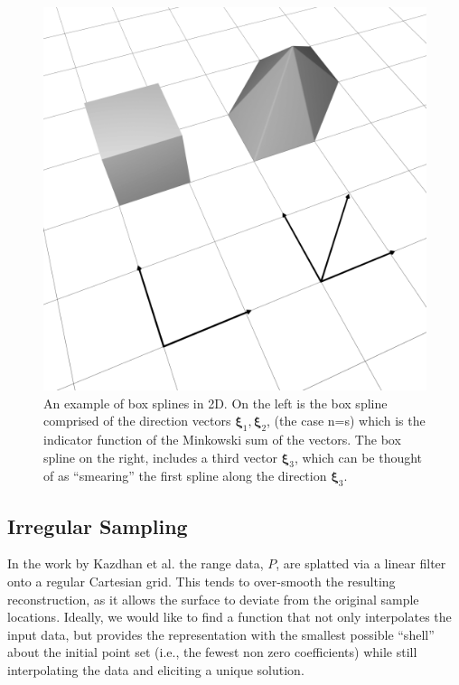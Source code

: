 \begin{figure}
  \centering
  \mbox{} \hfill
	\includegraphics[width=\linewidth]{figures/boxspline/2dex}
  \caption{\label{fig:box2d}%
  An example of box splines in 2D. On the left is the box spline comprised of the direction vectors $\mathbf{\xi}_1, \mathbf{\xi}_2$, (the case n=s) which is the indicator function of the Minkowski sum of the vectors. The box spline on the right, includes a third vector $\mathbf{\xi}_3$, which can be thought of as ``smearing'' the first spline along the direction $\mathbf{\xi}_3$.
  }
\end{figure}


\subsection{Irregular Sampling}
\label{sec:vari_review}
In the work by Kazdhan et al. \cite{fftk} the range data, $P$, are splatted via a linear filter onto a regular Cartesian grid. 
This tends to over-smooth the resulting reconstruction, as it allows the surface to deviate from the original sample locations. 
Ideally, we would like to find a function that not only interpolates the input data, but provides the representation with the smallest possible ``shell'' about the initial point set (i.e., the fewest non zero coefficients) while still interpolating the data and eliciting a unique solution. 

